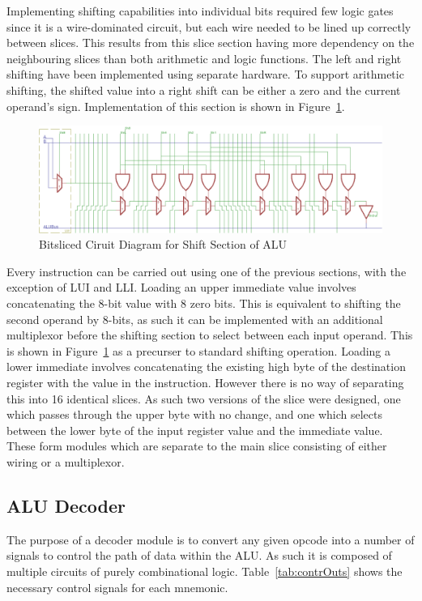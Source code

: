 Implementing shifting capabilities into individual bits required few logic gates since it is a wire-dominated circuit, but each wire needed to be lined up correctly between slices. 
This results from this slice section having more dependency on the neighbouring slices than both arithmetic and logic functions. 
The left and right shifting have been implemented using separate hardware. 
To support arithmetic shifting, the shifted value into a right shift can be either a zero and the current operand's sign.
Implementation of this section is shown in Figure~\ref{fig:ShiftSlice}. 

\begin{figure}[h]
	\centering
	\includegraphics[scale=0.75]{Figures/ShiftSlice.png}
	\caption{Bitsliced Ciruit Diagram for Shift Section of ALU}
	\label{fig:ShiftSlice}
\end{figure}

Every instruction can be carried out using one of the previous sections, with the exception of LUI and LLI. Loading an upper immediate value involves concatenating the 8-bit value with 8 zero bits. 
This is equivalent to shifting the second operand by 8-bits, as such it can be implemented with an additional multiplexor before the shifting section to select between each input operand. 
This is shown in Figure~\ref{fig:ShiftSlice} as a precurser to standard shifting operation. 
Loading a lower immediate involves concatenating the existing high byte of the destination register with the value in the instruction. 
However there is no way of separating this into 16 identical slices. 
As such two versions of the slice were designed, one which passes through the upper byte with no change, and one which selects between the lower byte of the input register value and the immediate value. 
These form modules which are separate to the main slice consisting of either wiring or a multiplexor.

\subsection{ALU Decoder}
The purpose of a decoder module is to convert any given opcode into a number of signals to control the path of data within the ALU. As such it is composed of multiple circuits of purely combinational logic. Table~\ref{tab:contrOuts} shows the necessary control signals for each mnemonic.

